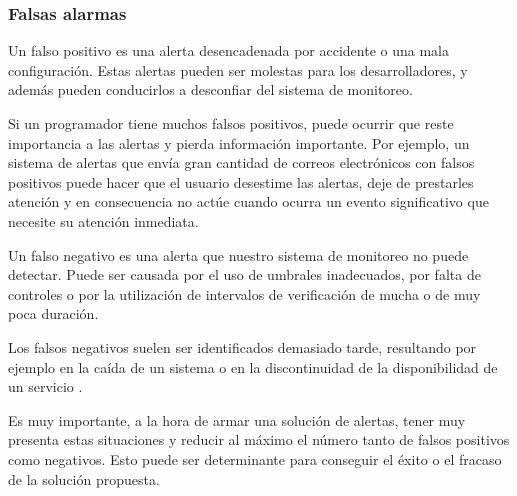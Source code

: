 \subsubsection*{Falsas alarmas}
\label{falsas_alarmas}

Un falso positivo es una alerta desencadenada por accidente o una mala
configuración. Estas alertas pueden ser molestas para los desarrolladores, y
además pueden conducirlos a desconfiar del sistema de monitoreo.

Si un programador tiene muchos falsos positivos, puede ocurrir que reste
importancia a las alertas y pierda información importante. Por ejemplo, un
sistema de alertas que envía gran cantidad de correos electrónicos con falsos
positivos puede hacer que el usuario desestime las alertas, deje de prestarles
atención y en consecuencia no actúe cuando ocurra un evento significativo que
necesite su atención inmediata.

Un falso negativo es una alerta que nuestro sistema de monitoreo no puede
detectar. Puede ser causada por el uso de umbrales inadecuados, por falta de
controles o por la utilización de intervalos de verificación de mucha o de muy
poca duración.

Los falsos negativos suelen ser identificados demasiado tarde, resultando por
ejemplo en la caída de un sistema o en la discontinuidad de la disponibilidad
de un servicio \cite[p.~16]{monitoreo:monitoring_with_grapfite}.

Es muy importante, a la hora de armar una solución de alertas, tener muy
presenta estas situaciones y reducir al máximo el número tanto de falsos
positivos como negativos. Esto puede ser determinante para conseguir el éxito o
el fracaso de la solución propuesta.

